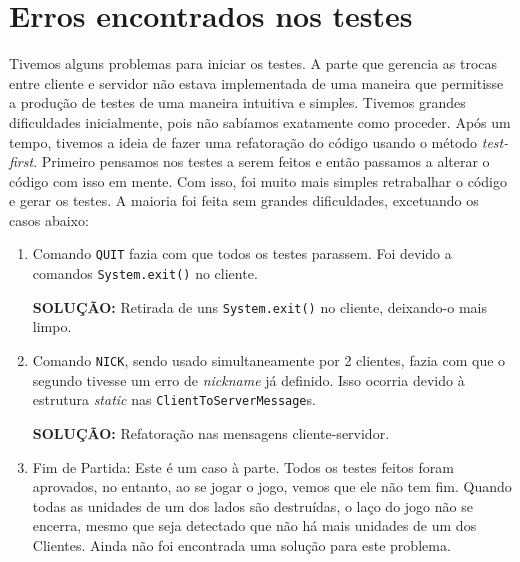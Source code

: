 \section{Erros encontrados nos testes}

Tivemos alguns problemas para iniciar os testes. A parte que gerencia as trocas
entre cliente e servidor não estava implementada de uma maneira que permitisse a
produção de testes de uma maneira intuitiva e simples. Tivemos grandes dificuldades
inicialmente, pois não sabíamos exatamente como proceder. Após um tempo, tivemos
a ideia de fazer uma refatoração do código usando o método \emph{test-first}.
Primeiro pensamos nos testes a serem feitos e então passamos a alterar o código
com isso em mente. Com isso, foi muito mais simples retrabalhar o código e gerar
os testes. A maioria foi feita sem grandes dificuldades, excetuando os casos abaixo:

\begin{enumerate}
    \item Comando \texttt{QUIT} fazia com que todos os testes parassem. Foi devido a
        comandos \texttt{System.exit()} no cliente.

       \textbf{SOLUÇÃO:} Retirada de uns \texttt{System.exit()} no cliente,
            deixando-o mais limpo.

    \item Comando \texttt{NICK}, sendo usado simultaneamente por 2 clientes, fazia
        com que o segundo tivesse um erro de \emph{nickname} já definido. Isso
        ocorria devido à estrutura \emph{static} nas \texttt{ClientToServerMessage}s.

       \textbf{SOLUÇÃO:} Refatoração nas mensagens cliente-servidor.

    \item Fim de Partida: Este é um caso à parte. Todos os testes feitos foram
        aprovados, no entanto, ao se jogar o jogo, vemos que ele não tem fim.
        Quando todas as unidades de um dos lados são destruídas, o laço do jogo não
        se encerra, mesmo que seja detectado que não há mais unidades de um dos
        Clientes. Ainda não foi encontrada uma solução para este problema.
\end{enumerate}
